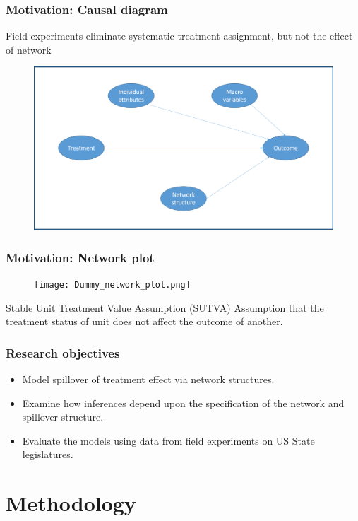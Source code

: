 \documentclass{beamer}
\begin{document}
\begin{frame}
\frametitle{Motivation: Causal diagram}
Field experiments eliminate systematic treatment assignment, but not the effect of network
\begin{figure}
\includegraphics[width=0.8\linewidth]{Causal_diagram_2.png}
\end{figure}
\end{frame}


\begin{frame}
\frametitle{Motivation: Network plot}
\begin{figure}
\texttt{[image: Dummy\_network\_plot.png]}
\end{figure}

\vspace{-0.5cm}
\begin{block}{Stable Unit Treatment Value Assumption (SUTVA)}
Assumption that the treatment status of unit does not affect the outcome of another.
\end{block}
\end{frame}


\begin{frame}
\frametitle{Research objectives}
\begin{itemize}
\item Model spillover of treatment effect via network structures.
\item Examine how inferences depend upon the specification of the network and spillover
structure.
\item Evaluate the models using data from field experiments on US State legislatures.
\end{itemize}
\end{frame}


\section{Methodology}
\end{document}
